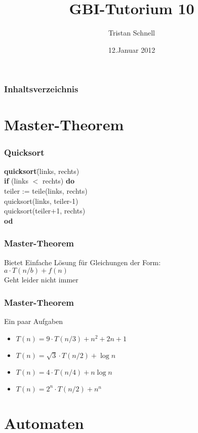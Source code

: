\documentclass{beamer}
\author{Tristan Schnell}
\title{GBI-Tutorium 10}
\date{12.Januar 2012}
\begin{document}
\begin {frame}
	\titlepage
\end {frame}

\begin {frame}
	\frametitle {Inhaltsverzeichnis}
	\tableofcontents
\end {frame}

\section{Master-Theorem}

\begin{frame}
	\frametitle{Quicksort}
	\begin{tabbing}
	\textbf{quick}\=\textbf{sort}\=(links, rechts)\\
     	\>\textbf{if} (links $<$ rechts) \textbf{do}\\
         	\> \>teiler := teile(links, rechts)\\
         	\> \>quicksort(links, teiler-1)\\
         	\> \>quicksort(teiler+1, rechts)\\
     	\>\textbf{od}
	\end{tabbing}
\end{frame}

\begin{frame}
	\frametitle{Master-Theorem}
	\begin{block}{Bietet}
		Einfache Lösung für Gleichungen der Form:\\
		$a\cdot T(n/b) +f(n)$\\
		\pause \bigskip
		Geht leider nicht immer
	\end{block}
\end{frame}


\begin{frame}
	\frametitle{Master-Theorem}
	\begin{block}{Ein paar Aufgaben}
		\begin{itemize}
			\item $T(n) = 9\cdot T(n/3) + n^2 + 2n + 1$
			\item $T(n) = \sqrt{3}\cdot T(n/2) + \log{n}$
			\item $T(n) = 4\cdot T(n/4) + n \log{n}$
			\item $T(n) = 2^n\cdot T(n/2) + n^n$
		\end{itemize}
	\end{block}
\end{frame}

\section{Automaten}
\end{document}
